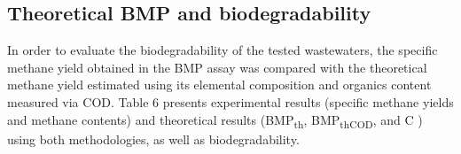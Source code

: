 \subsection{Theoretical BMP and biodegradability}
In order to evaluate the biodegradability of the tested wastewaters, the specific methane yield obtained in the BMP assay was compared with the theoretical methane yield estimated using its elemental composition and organics content measured via COD. Table 6 presents experimental results (specific methane yields and methane contents) and theoretical results (BMP\textsubscript{th}, BMP\textsubscript{thCOD}, and C ) using both methodologies, as well as biodegradability.

